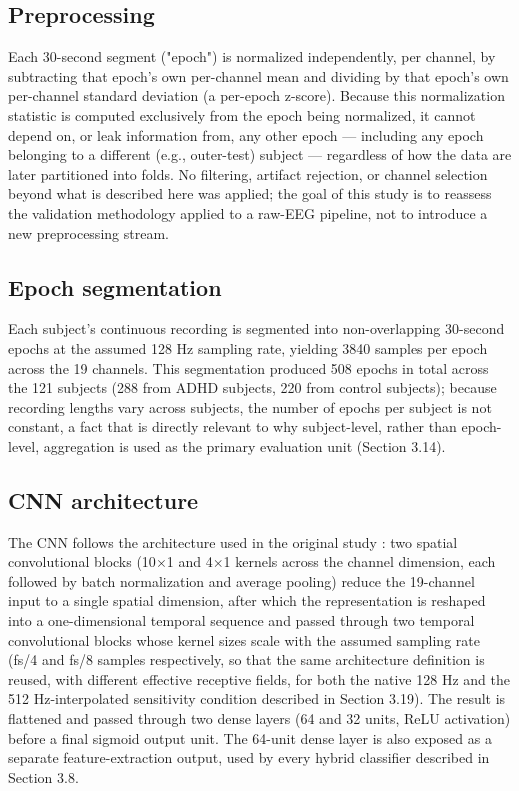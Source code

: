\documentclass[a4paper,fleqn]{cas-sc}
\begin{document}
\subsection{Preprocessing}

Each 30-second segment ("epoch") is normalized independently, per channel, by subtracting that epoch's own per-channel mean and dividing by that epoch's own per-channel standard deviation (a per-epoch z-score). Because this normalization statistic is computed exclusively from the epoch being normalized, it cannot depend on, or leak information from, any other epoch --- including any epoch belonging to a different (e.g., outer-test) subject --- regardless of how the data are later partitioned into folds. No filtering, artifact rejection, or channel selection beyond what is described here was applied; the goal of this study is to reassess the validation methodology applied to a raw-EEG pipeline, not to introduce a new preprocessing stream.



\subsection{Epoch segmentation}

Each subject's continuous recording is segmented into non-overlapping 30-second epochs at the assumed 128 Hz sampling rate, yielding 3840 samples per epoch across the 19 channels. This segmentation produced 508 epochs in total across the 121 subjects (288 from ADHD subjects, 220 from control subjects); because recording lengths vary across subjects, the number of epochs per subject is not constant, a fact that is directly relevant to why subject-level, rather than epoch-level, aggregation is used as the primary evaluation unit (Section 3.14).



\subsection{CNN architecture}

The CNN follows the architecture used in the original study \cite{taghibeyglou2022detection}: two spatial convolutional blocks (10$\times$1 and 4$\times$1 kernels across the channel dimension, each followed by batch normalization and average pooling) reduce the 19-channel input to a single spatial dimension, after which the representation is reshaped into a one-dimensional temporal sequence and passed through two temporal convolutional blocks whose kernel sizes scale with the assumed sampling rate (fs/4 and fs/8 samples respectively, so that the same architecture definition is reused, with different effective receptive fields, for both the native 128 Hz and the 512 Hz-interpolated sensitivity condition described in Section 3.19). The result is flattened and passed through two dense layers (64 and 32 units, ReLU activation) before a final sigmoid output unit. The 64-unit dense layer is also exposed as a separate feature-extraction output, used by every hybrid classifier described in Section 3.8.
\end{document}
